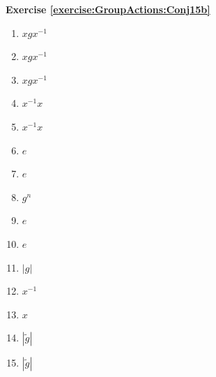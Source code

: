 \noindent\textbf{Exercise \ref{exercise:GroupActions:Conj15b}}
%
\begin{multicols}{4}
\begin{enumerate}
\item
$xgx^{-1}$

\item
$xgx^{-1}$

\item
$xgx^{-1}$

\item
$x^{-1}x$

\item
$x^{-1}x$

\item
$e$

\item
$e$

\item
$g^n$

\item
$e$

\item
$e$

\item
$|g|$

\item
$x^{-1}$

\item
$x$

\item
$|\tilde{g}|$

\item
$|\tilde{g}|$
\end{enumerate}
\end{multicols}

